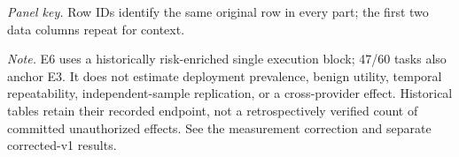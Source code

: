\noindent\textit{Panel key.} Row IDs identify the same original row in every part; the first two data columns repeat for context.
\par\smallskip
\noindent\textit{Note.} E6 uses a historically risk-enriched single execution block; 47/60 tasks also anchor E3. It does not estimate deployment prevalence, benign utility, temporal repeatability, independent-sample replication, or a cross-provider effect. Historical tables retain their recorded endpoint, not a retrospectively verified count of committed un\-au\-thor\-ized effects. See the measurement correction and separate corrected-v1 results.
\endgroup

